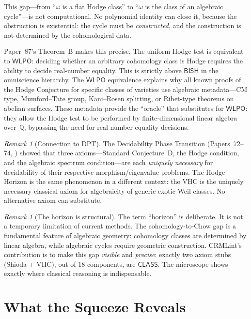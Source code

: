 \documentclass[11pt]{article}
\theoremstyle{plain}
\theoremstyle{definition}
\theoremstyle{remark}
\newtheorem{remark}[theorem]{Remark}
\newcommand{\QQ}{\mathbb{Q}}
\newcommand{\BISH}{\mathsf{BISH}}
\newcommand{\WLPO}{\mathsf{WLPO}}
\newcommand{\CLASS}{\mathsf{CLASS}}
\begin{document}
This gap---from ``$\omega$ is a flat Hodge class'' to ``$\omega$
is the class of an algebraic cycle''---is not computational.  No
polynomial identity can close it, because the obstruction is
existential: the cycle must be \emph{constructed}, and the
construction is not determined by the cohomological data.

Paper~87's Theorem~B makes this precise.  The uniform Hodge test
is equivalent to $\WLPO$: deciding whether an arbitrary cohomology
class is Hodge requires the ability to decide real-number equality.
This is strictly above $\BISH$ in the omniscience hierarchy.  The
$\WLPO$ equivalence explains why all known proofs of the Hodge
Conjecture for specific classes of varieties use algebraic
metadata---CM type, Mumford--Tate group, Kani--Rosen splitting,
or Ribet-type theorems on abelian surfaces.
These metadata provide the ``oracle'' that substitutes for $\WLPO$:
they allow the Hodge test to be performed by finite-dimensional
linear algebra over~$\QQ$, bypassing the need for real-number
equality decisions.

\begin{remark}[Connection to DPT]
The Decidability Phase Transition (Papers~72--74, \cite{p72,p73,p74})
showed that three axioms---Standard Conjecture~D, the Hodge
condition, and the algebraic spectrum condition---are each
\emph{uniquely necessary} for decidability of their respective
morphism/eigenvalue problems.  The Hodge Horizon is the same
phenomenon in a different context: the VHC is the uniquely necessary
classical axiom for algebraicity of generic exotic Weil classes.
No alternative axiom can substitute.
\end{remark}

\begin{remark}[The horizon is structural]
The term ``horizon'' is deliberate.  It is not a temporary limitation
of current methods.  The cohomology-to-Chow gap is a fundamental
feature of algebraic geometry: cohomology classes are determined by
linear algebra, while algebraic cycles require geometric
construction.  CRMLint's contribution is to make this gap
\emph{visible} and \emph{precise}: exactly two axiom stubs
(Shioda + VHC), out of 18 components, are $\CLASS$.  The microscope
shows exactly where classical reasoning is indispensable.
\end{remark}


\section{What the Squeeze Reveals}\label{sec:yield}
\end{document}

